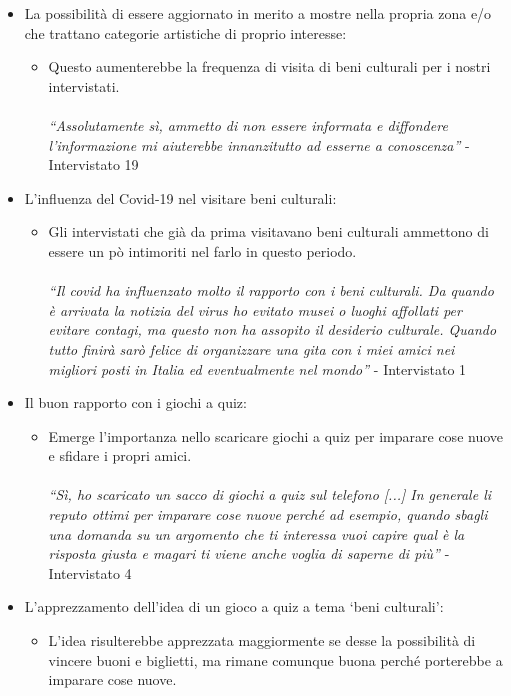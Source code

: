 \documentclass{article}
\begin{document}
\begin{itemize}
\begin{itemize}
\end{itemize}
\item La possibilità di essere aggiornato in merito a mostre nella propria zona e/o che trattano categorie artistiche di proprio interesse:
\begin{itemize}
\item Questo aumenterebbe la frequenza di visita di beni culturali per i nostri intervistati.
\\\\
\textit{“Assolutamente sì, ammetto di non essere informata e diffondere l'informazione mi aiuterebbe innanzitutto ad esserne a conoscenza”} - Intervistato 19
\end{itemize}
\item L’influenza del Covid-19 nel visitare beni culturali:
\begin{itemize}
\item Gli intervistati che già da prima visitavano beni culturali ammettono di essere un pò intimoriti nel farlo in questo periodo.
\\\\
\textit{“Il covid ha influenzato molto il rapporto con i beni culturali. Da quando è arrivata la notizia del virus ho evitato musei o luoghi affollati per evitare contagi, ma questo non ha assopito il desiderio culturale. Quando tutto finirà sarò felice di organizzare una gita con i miei amici nei migliori posti in Italia ed eventualmente nel mondo”} - Intervistato 1
\end{itemize}
\item Il buon rapporto con i giochi a quiz:
\begin{itemize}
\item Emerge l’importanza nello scaricare giochi a quiz per imparare cose nuove e sfidare i propri amici.
\\\\
\textit{“Sì, ho scaricato un sacco di giochi a quiz sul telefono [...]  In generale li reputo ottimi per imparare cose nuove perché ad esempio, quando sbagli una domanda su un argomento che ti interessa vuoi capire qual è la risposta giusta e magari ti viene anche voglia di saperne di più”} - Intervistato 4
\end{itemize}
\item L’apprezzamento dell’idea di un gioco a quiz a tema ‘beni culturali’:
\begin{itemize}
\item L’idea risulterebbe apprezzata maggiormente se desse la possibilità di vincere buoni e biglietti, ma rimane comunque buona perché porterebbe a imparare cose nuove.

\end{itemize}
\end{itemize}
\end{document}
